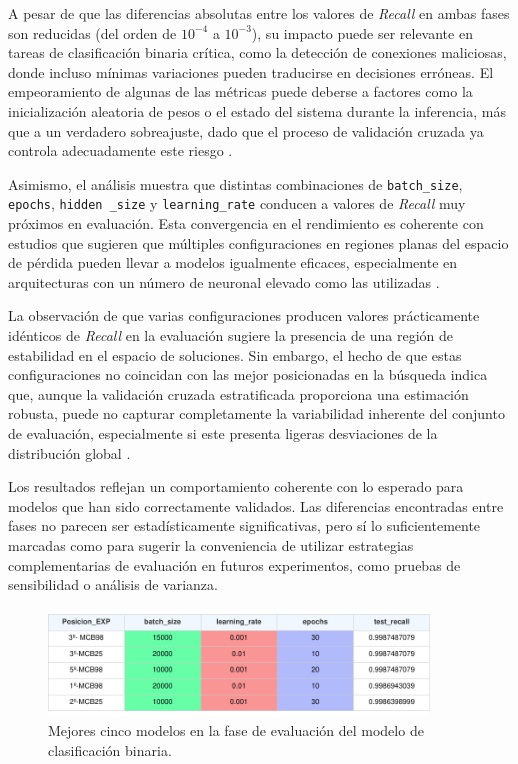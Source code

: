 A pesar de que las diferencias absolutas entre los valores de \textit{Recall} en ambas fases son reducidas (del orden de $10^{-4}$ a $10^{-3}$), su impacto puede ser relevante en tareas de clasificación binaria crítica, como la detección de conexiones maliciosas, donde incluso mínimas variaciones pueden traducirse en decisiones erróneas. El empeoramiento de algunas de las métricas puede deberse a factores como la inicialización aleatoria de pesos o el estado del sistema durante la inferencia, más que a un verdadero sobreajuste, dado que el proceso de validación cruzada ya controla adecuadamente este riesgo \cite{goodfellow2016deep}.

Asimismo, el análisis muestra que distintas combinaciones de \texttt{batch\_size}, \texttt{epochs}, \texttt{hidden \_size} y \texttt{learning\_rate} conducen a valores de \textit{Recall} muy próximos en evaluación. Esta convergencia en el rendimiento es coherente con estudios que sugieren que múltiples configuraciones en regiones planas del espacio de pérdida pueden llevar a modelos igualmente eficaces, especialmente en arquitecturas con un número de neuronal elevado como las utilizadas \cite{bouthillier2021sloppy}.

La observación de que varias configuraciones producen valores prácticamente idénticos de \textit{Recall} en la evaluación sugiere la presencia de una región de estabilidad en el espacio de soluciones. Sin embargo, el hecho de que estas configuraciones no coincidan con las mejor posicionadas en la búsqueda indica que, aunque la validación cruzada estratificada proporciona una estimación robusta, puede no capturar completamente la variabilidad inherente del conjunto de evaluación, especialmente si este presenta ligeras desviaciones de la distribución global \cite{recht2019imagenet}.

Los resultados reflejan un comportamiento coherente con lo esperado para modelos que han sido correctamente validados. Las diferencias encontradas entre fases no parecen ser estadísticamente significativas, pero sí lo suficientemente marcadas como para sugerir la conveniencia de utilizar estrategias complementarias de evaluación en futuros experimentos, como pruebas de sensibilidad o análisis de varianza.

\begin{figure}[H]
    \centering
    \includegraphics[width=0.9\textwidth]{./img/evaluacion/resultados/top5EVALMCB.pdf}
    \caption{Mejores cinco modelos en la fase de evaluación del modelo de clasificación binaria.}
    \label{fig:top5EVALMCB}
\end{figure}

